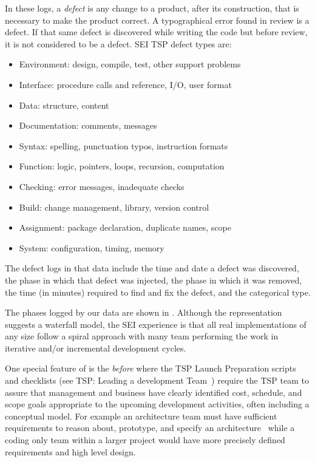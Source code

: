 In these logs, a  \emph{defect} is any change to a product, after its construction, that is necessary to make the product correct.  A typographical error found in review is a defect. If that same defect is discovered while writing the code but before review, it is not considered to be a defect. 
SEI TSP defect types are:
\begin{itemize}
\item Environment: design, compile, test,  other support  problems
\item Interface: procedure calls and reference, I/O, user format
\item Data: structure, content
\item Documentation: comments, messages
\item Syntax: spelling, punctuation typos, instruction formats
\item Function: logic, pointers, loops, recursion, computation  
\item Checking: error messages, inadequate checks
\item Build: change management, library, version control
\item Assignment: package
declaration, duplicate names, scope
\item System: configuration, timing, memory
\end{itemize}
The defect logs in that data  include the time and date a defect was discovered, the phase in which that defect was injected, the phase in which it was removed, the time (in minutes) required to find and fix the defect, and the categorical type.

The phases logged by our data are shown in .
 Although the representation suggests a waterfall model, the SEI experience is that all real implementations of any size follow a spiral approach with many team performing the work in iterative and/or incremental development cycles.

One special feature of   is
the {\em before} where the   TSP Launch Preparation scripts and checklists (see TSP: Leading a development Team~\cite{Humphrey:2005}) require the TSP team to assure that management and business have clearly identified cost, schedule, and scope goals appropriate to the upcoming development activities, often including a conceptual model. For example an architecture team must have sufficient requirements to reason about, prototype, and specify an architecture~\cite{Bachmann13} while a coding only team within a larger project would have more precisely defined requirements and high level design.
 
